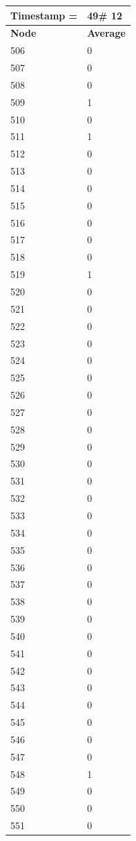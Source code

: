 \begin{tabular}{|l||l|}
\hline
\textbf{Timestamp =} & \textbf{49}\# 12\\\hline
	\textbf{Node} & \textbf{Average} \\ \hline
\hline
	506 & 0 \\ \hline
	507 & 0 \\ \hline
	508 & 0 \\ \hline
	509 & 1 \\ \hline
	510 & 0 \\ \hline
	511 & 1 \\ \hline
	512 & 0 \\ \hline
	513 & 0 \\ \hline
	514 & 0 \\ \hline
	515 & 0 \\ \hline
	516 & 0 \\ \hline
	517 & 0 \\ \hline
	518 & 0 \\ \hline
	519 & 1 \\ \hline
	520 & 0 \\ \hline
	521 & 0 \\ \hline
	522 & 0 \\ \hline
	523 & 0 \\ \hline
	524 & 0 \\ \hline
	525 & 0 \\ \hline
	526 & 0 \\ \hline
	527 & 0 \\ \hline
	528 & 0 \\ \hline
	529 & 0 \\ \hline
	530 & 0 \\ \hline
	531 & 0 \\ \hline
	532 & 0 \\ \hline
	533 & 0 \\ \hline
	534 & 0 \\ \hline
	535 & 0 \\ \hline
	536 & 0 \\ \hline
	537 & 0 \\ \hline
	538 & 0 \\ \hline
	539 & 0 \\ \hline
	540 & 0 \\ \hline
	541 & 0 \\ \hline
	542 & 0 \\ \hline
	543 & 0 \\ \hline
	544 & 0 \\ \hline
	545 & 0 \\ \hline
	546 & 0 \\ \hline
	547 & 0 \\ \hline
	548 & 1 \\ \hline
	549 & 0 \\ \hline
	550 & 0 \\ \hline
	551 & 0 \\ \hline
\end{tabular}

